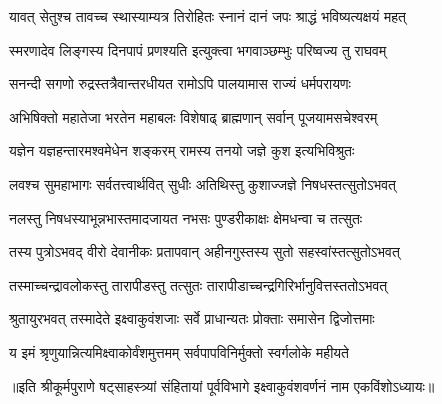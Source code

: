 \twolineshloka
{यावत् सेतुश्च तावच्च स्थास्याम्यत्र तिरोहितः}
{स्नानं दानं जपः श्राद्धं भविष्यत्यक्षयं महत्} %

\twolineshloka
{स्मरणादेव लिङ्गस्य दिनपापं प्रणश्यति}
{इत्युक्त्वा भगवाञ्छम्भुः परिष्वज्य तु राघवम्} %

\twolineshloka
{सनन्दी सगणो रुद्रस्तत्रैवान्तरधीयत}
{रामोऽपि पालयामास राज्यं धर्मपरायणः} %

\twolineshloka
{अभिषिक्तो महातेजा भरतेन महाबलः}
{विशेषाढ् ब्राह्मणान् सर्वान् पूजयामसचेश्वरम्} %

\twolineshloka
{यज्ञेन यज्ञहन्तारमश्वमेधेन शङ्करम्}
{रामस्य तनयो जज्ञे कुश इत्यभिविश्रुतः} %

\twolineshloka
{लवश्च सुमहाभागः सर्वतत्त्वार्थवित् सुधीः}
{अतिथिस्तु कुशाज्जज्ञे निषधस्तत्सुतोऽभवत्} %

\twolineshloka
{नलस्तु निषधस्याभून्नभास्तमादजायत}
{नभसः पुण्डरीकाक्षः क्षेमधन्वा च तत्सुतः} %

\twolineshloka
{तस्य पुत्रोऽभवद् वीरो देवानीकः प्रतापवान्}
{अहीनगुस्तस्य सुतो सहस्वांस्तत्सुतोऽभवत्} %

\twolineshloka
{तस्माच्चन्द्रावलोकस्तु तारापीडस्तु तत्सुतः}
{तारापीडाच्चन्द्रगिरिर्भानुवित्तस्ततोऽभवत्} %

\twolineshloka
{श्रुतायुरभवत् तस्मादेते इक्ष्वाकुवंशजाः}
{सर्वे प्राधान्यतः प्रोक्ताः समासेन द्विजोत्तमाः} %

\twolineshloka
{य इमं श्रृणुयान्नित्यमिक्ष्वाकोर्वंशमुत्तमम्}
{सर्वपापविनिर्मुक्तो स्वर्गलोके महीयते} %

॥इति श्रीकूर्मपुराणे षट्‌साहस्त्र्यां संहितायां पूर्वविभागे इक्ष्वाकुवंशवर्णनं नाम एकविंशोऽध्यायः॥